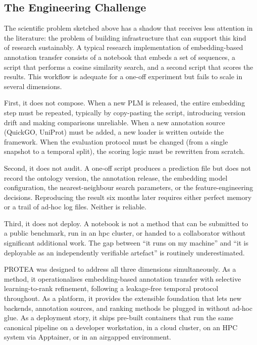 \subsection{The Engineering Challenge}
\label{subsec:engineering-challenge}

The scientific problem sketched above has a shadow that receives less attention in the
literature: the problem of building infrastructure that can support this kind of
research sustainably. A typical research implementation of embedding-based annotation
transfer consists of a notebook that embeds a set of sequences, a script that performs
a cosine similarity search, and a second script that scores the results. This workflow
is adequate for a one-off experiment but fails to scale in several dimensions.

First, it does not compose. When a new PLM is released, the entire embedding step must
be repeated, typically by copy-pasting the script, introducing version drift and
making comparisons unreliable. When a new annotation source (QuickGO, UniProt) must
be added, a new loader is written outside the framework. When the evaluation protocol
must be changed (from a single snapshot to a temporal split), the scoring logic must
be rewritten from scratch.

Second, it does not audit. A one-off script produces a prediction file but does not
record the ontology version, the annotation release, the embedding model
configuration, the nearest-neighbour search parameters, or the feature-engineering
decisions. Reproducing the result six months later requires either perfect memory or a
trail of ad-hoc log files. Neither is reliable.

Third, it does not deploy. A notebook is not a method that can be submitted to a
public benchmark, run in an \gls{hpc} cluster, or handed to a collaborator without
significant additional work. The gap between ``it runs on my machine'' and ``it is
deployable as an independently verifiable artefact'' is routinely underestimated.

PROTEA was designed to address all three dimensions simultaneously. As a method, it
operationalises embedding-based annotation transfer with selective learning-to-rank
refinement, following a leakage-free temporal protocol throughout. As a platform, it
provides the extensible foundation that lets new backends, annotation sources, and
ranking methods be plugged in without ad-hoc glue. As a deployment story, it ships
pre-built containers that run the same canonical pipeline on a developer workstation,
in a cloud cluster, on an HPC system via Apptainer, or in an airgapped environment.

